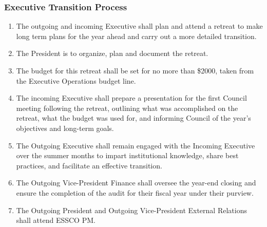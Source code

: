 \subsubsection{Executive Transition Process}
\label{executive-transition-process}
\begin{enumerate}
 \item
  The outgoing and incoming Executive shall plan and attend a retreat to make long term plans for the year ahead and carry out a more detailed transition.
 \item
  The President is to organize, plan and document the retreat.
 \item
  The budget for this retreat shall be set for no more than \$2000, taken from the Executive Operations budget line.
 \item
  The incoming Executive shall prepare a presentation for the first Council meeting following the retreat, outlining what was accomplished on the retreat, what the budget was used for, and informing Council of the year's objectives and long-term goals.
 \item
  The Outgoing Executive shall remain engaged with the Incoming Executive over the summer months to impart institutional knowledge, share best practices, and facilitate an effective transition.
 \item
  The Outgoing Vice-President Finance shall oversee the year-end closing and ensure the completion of the audit for their fiscal year under their purview.
 \item
  The Outgoing President and Outgoing Vice-President External Relations shall attend ESSCO PM.
\end{enumerate}

